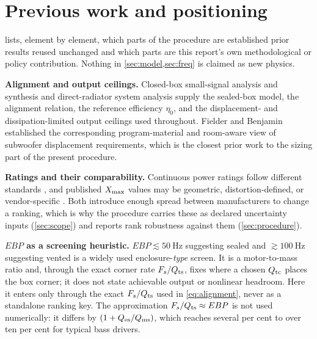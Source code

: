 \section{Previous work and positioning}
\label{sec:prevwork}

 lists, element by element, which parts of the
procedure are established prior results reused unchanged and which parts
are this report's own methodological or policy contribution. Nothing in
\cref{sec:model,sec:freq} is claimed as new physics.



\textbf{Alignment and output ceilings.} Closed-box small-signal analysis
and synthesis \cite{small1972} and direct-radiator system analysis
\cite{small1972direct} supply the sealed-box model, the alignment relation,
the reference efficiency $\eta_0$, and the displacement- and
dissipation-limited output ceilings used throughout. Fielder and Benjamin
\cite{fielder1988} established the corresponding program-material and
room-aware view of subwoofer displacement requirements, which is the
closest prior work to the sizing part of the present procedure.

\textbf{Ratings and their comparability.} Continuous power ratings follow
different standards \cite{aes2}, and published $X_{\mathrm{max}}$ values may be
geometric, distortion-defined, or vendor-specific
\cite{iec62458,klippel2003xmax,klippel2006}. Both introduce enough spread
between manufacturers to change a ranking, which is why the procedure
carries these as declared uncertainty inputs
(\cref{sec:scope}) and reports rank robustness against them
(\cref{sec:procedure}).

\textbf{$EBP$ as a screening heuristic.} $EBP\lesssim\SI{50}{\hertz}$
suggesting sealed and $\gtrsim\SI{100}{\hertz}$ suggesting vented
\cite{dickason2006} is a widely used enclosure-\emph{type} screen. It is a
motor-to-mass ratio and, through the exact corner rate $F_s/Q_{\mathrm{ts}}$, fixes
where a chosen $Q_{\mathrm{tc}}$ places the box corner; it does not state achievable
output or nonlinear headroom. Here it enters only through the exact
$F_s/Q_{\mathrm{ts}}$ used in \cref{eq:alignment}, never as a standalone ranking key.
The approximation $F_s/Q_{\mathrm{ts}}\approx EBP$ is not used numerically: it differs
by $(1+Q_{\mathrm{es}}/Q_{\mathrm{ms}})$, which reaches several per cent to over ten per cent for
typical bass drivers.

